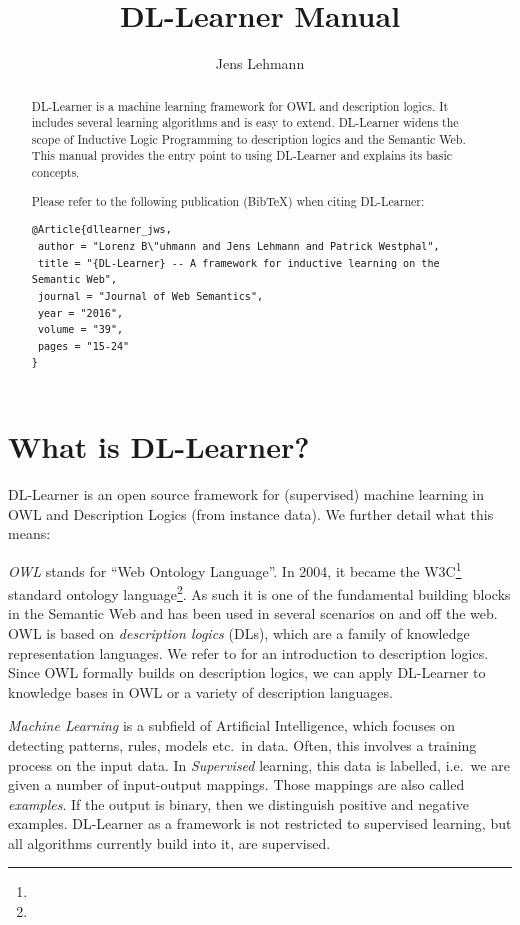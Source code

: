 \documentclass[a4paper,12pt]{scrartcl}
\title{DL-Learner Manual}
\author{Jens Lehmann}
\begin{document}
\maketitle

\begin{abstract}
\vspace{-15pt}
DL-Learner is a machine learning framework for OWL and description logics. It includes several learning algorithms and is easy to extend. DL-Learner widens the scope of Inductive Logic Programming to description logics and the Semantic Web. This manual provides the entry point to using DL-Learner and explains its basic concepts.

Please refer to the following publication (BibTeX) when citing DL-Learner:
{\fontsize{8.6pt}{12pt}
\begin{verbatim}
@Article{dllearner_jws,
 author = "Lorenz B\"uhmann and Jens Lehmann and Patrick Westphal",
 title = "{DL-Learner} -- A framework for inductive learning on the Semantic Web",
 journal = "Journal of Web Semantics",
 year = "2016",
 volume = "39",
 pages = "15-24"
}
\end{verbatim}
}
\end{abstract}

\clearpage 

\tableofcontents

\clearpage

\section{What is DL-Learner?}
\label{sec:whatis}

DL-Learner is an open source framework for (supervised) machine learning in OWL and Description Logics (from instance data). We further detail what this means:

\emph{OWL} stands for ``Web Ontology Language''. In 2004, it became the W3C\footnote{\wwwc} standard ontology language\footnote{\owl}. As such it is one of the fundamental building blocks in the Semantic Web and has been used in several scenarios on and off the web. OWL is based on \emph{description logics} (DLs), which are a family of knowledge representation languages. We refer to \cite{dlhb} for an introduction to description logics. Since OWL formally builds on description logics, we can apply DL-Learner to knowledge bases in OWL or a variety of description languages.

\emph{Machine Learning} is a subfield of Artificial Intelligence, which focuses on detecting patterns, rules, models etc.~in data. Often, this involves a training process on the input data. In \emph{Supervised} learning, this data is labelled, i.e.~we are given a number of input-output mappings. Those mappings are also called \emph{examples}. If the output is binary, then we distinguish positive and negative examples. DL-Learner as a framework is not restricted to supervised learning, but all algorithms currently build into it, are supervised.
\end{document}
